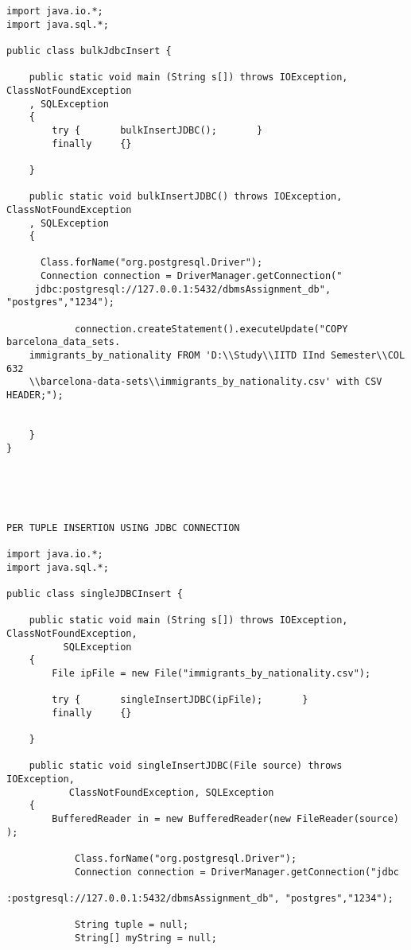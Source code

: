 \documentclass[10pt]{article}
\begin{document}
\begin{lstlisting}[frame=single]
import java.io.*;
import java.sql.*;

public class bulkJdbcInsert {

    public static void main (String s[]) throws IOException, ClassNotFoundException
	, SQLException
	{
		try {		bulkInsertJDBC();		}
		finally		{}
				
	}
	
    public static void bulkInsertJDBC() throws IOException, ClassNotFoundException
	, SQLException
	{
			
	  Class.forName("org.postgresql.Driver");
	  Connection connection = DriverManager.getConnection("
	 jdbc:postgresql://127.0.0.1:5432/dbmsAssignment_db", "postgres","1234");
			            
            connection.createStatement().executeUpdate("COPY barcelona_data_sets.
	immigrants_by_nationality FROM 'D:\\Study\\IITD IInd Semester\\COL 632
	\\barcelona-data-sets\\immigrants_by_nationality.csv' with CSV HEADER;");
			
		
	}
}





PER TUPLE INSERTION USING JDBC CONNECTION

import java.io.*;
import java.sql.*;

public class singleJDBCInsert {

	public static void main (String s[]) throws IOException, ClassNotFoundException,
          SQLException
	{
		File ipFile = new File("immigrants_by_nationality.csv");
		
		try {		singleInsertJDBC(ipFile);		}
		finally		{}
				
	}
	
	public static void singleInsertJDBC(File source) throws IOException, 
           ClassNotFoundException, SQLException
	{
		BufferedReader in = new BufferedReader(new FileReader(source) );
			
			Class.forName("org.postgresql.Driver");
			Connection connection = DriverManager.getConnection("jdbc
                                :postgresql://127.0.0.1:5432/dbmsAssignment_db", "postgres","1234");		 
				
			String tuple = null;
			String[] myString = null;
			            

\end{lstlisting}
\end{document}
